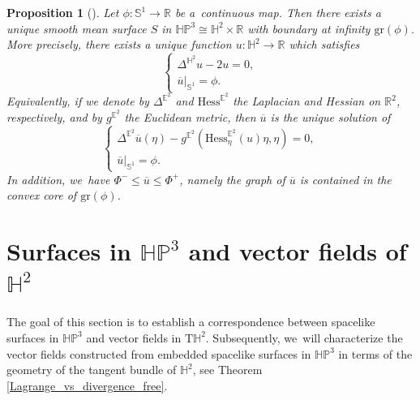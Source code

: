 \documentclass[11pt]{article}
\theoremstyle{plain}
\newtheorem{prop}[cor]{Proposition}
\theoremstyle{definition}
\newcommand{\HP}{\mathbb{HP}^3}
\begin{document}
\begin{prop}[{\cite[p.\,668, Prop.\,16.2.37, Lem.\,6.2.42]{barbotfillastre}}]\label{BF_platau_HP}
Let $\phi:\mathbb{S}^1\to\mathbb{R}$ be a~continuous map. Then there exists a unique smooth mean surface $S$ in $\HP\cong\mathbb{H}^2\times\mathbb{R}$ with boundary at infinity $\mathrm{gr}(\phi)$. More precisely, there exists a unique function $u:\mathbb{H}^2\to\mathbb{R}$ which satisfies
\begin{equation}\label{platau_HP}
\begin{cases}
\Delta^{\mathbb{H}^2} u-2u=0, \\
\overline{u}|_{\mathbb{S}^1}=\phi.
\end{cases}\end{equation}
Equivalently, if we denote by \(\Delta^{\mathbb{E}^2}\) and \(\mathrm{Hess}^{\mathbb{E}^2}\) the Laplacian and Hessian on \(\mathbb{R}^2\), respectively, and by \(g^{\mathbb{E}^2}\) the Euclidean metric, then \(\overline{u}\) is the unique solution of \begin{equation}\label{platau_HPE}
\begin{cases}
\Delta^{\mathbb{E}^2}\overline{u}(\eta)-g^{\mathbb{E}^2}(\mathrm{Hess}_{\eta}^{\mathbb{E}^2}(u)\eta,\eta)=0, \\
\overline{u}|_{\mathbb{S}^1}=\phi.
\end{cases}\end{equation}
In addition, we~have $\Phi^-\leq\overline{u}\leq \Phi^+$, namely the graph of $\overline{u}$ is contained in the convex core of $\mathrm{gr}(\phi)$.
\end{prop}

\section{Surfaces in \texorpdfstring{$\HP$}{HP} and vector fields of \texorpdfstring{$\mathbb{H}^2$}{H2}}
\label{sec4_correpondance}
The goal of this section is to establish a correspondence between spacelike surfaces in $\HP$ and vector fields in $\mathrm{T}\mathbb{H}^2$. Subsequently, we~will characterize the vector fields constructed from embedded spacelike surfaces in $\HP$ in terms of the geometry of the tangent bundle of $\mathbb{H}^2$, see Theorem \ref{Lagrange_vs_divergence_free}.
\end{document}
